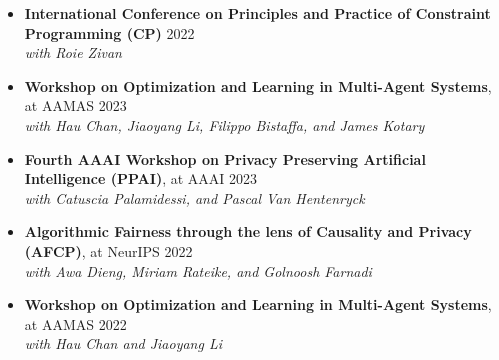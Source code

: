 
\begin{itemize}    
    \item {\bf International Conference on Principles and Practice of Constraint Programming (CP)}  \hfill{2022} \\
    {\em with Roie Zivan}
\end{itemize}

  \begin{itemize}
    \item 
    {\bf Workshop on Optimization and Learning in Multi-Agent Systems}, at AAMAS \hfill{2023}
    \\{\em with Hau Chan, Jiaoyang Li, Filippo Bistaffa, and James Kotary}

    \item 
    {\bf Fourth AAAI Workshop on Privacy Preserving Artificial Intelligence (PPAI)}, at AAAI   \hfill{2023}
    \\{\em with Catuscia Palamidessi, and Pascal Van Hentenryck}

    \item
    {\bf Algorithmic Fairness through the lens of Causality and Privacy (AFCP)}, at NeurIPS \hfill {2022}
    \\{\em with Awa Dieng, Miriam Rateike, and Golnoosh Farnadi}

    \item 
    {\bf Workshop on Optimization and Learning in Multi-Agent Systems}, at AAMAS \hfill{2022}
    \\{\em with Hau Chan and Jiaoyang Li}


\end{itemize}
